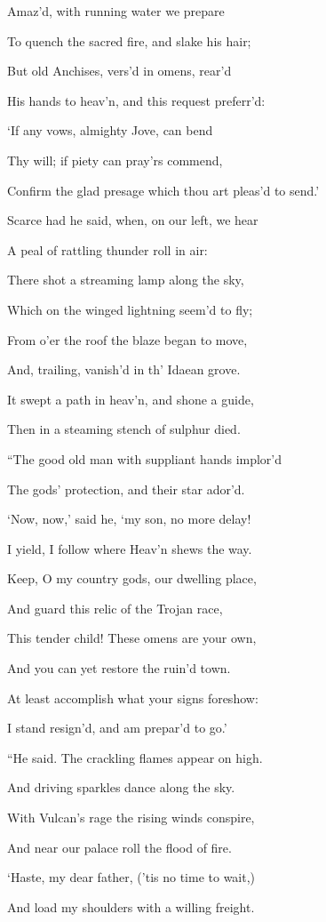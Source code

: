Amaz’d, with running water we prepare

To quench the sacred fire, and slake his hair;

But old Anchises, vers’d in omens, rear’d

His hands to heav’n, and this request preferr’d:

‘If any vows, almighty Jove, can bend

Thy will; if piety can pray’rs commend,

Confirm the glad presage which thou art pleas’d to send.’

Scarce had he said, when, on our left, we hear

A peal of rattling thunder roll in air:

There shot a streaming lamp along the sky,

Which on the winged lightning seem’d to fly;

From o’er the roof the blaze began to move,

And, trailing, vanish’d in th’ Idaean grove.

It swept a path in heav’n, and shone a guide,

Then in a steaming stench of sulphur died.

“The good old man with suppliant hands implor’d

The gods’ protection, and their star ador’d.

‘Now, now,’ said he, ‘my son, no more delay!

I yield, I follow where Heav’n shews the way.

Keep, O my country gods, our dwelling place,

And guard this relic of the Trojan race,

This tender child! These omens are your own,

And you can yet restore the ruin’d town.

At least accomplish what your signs foreshow:

I stand resign’d, and am prepar’d to go.’

“He said. The crackling flames appear on high.

And driving sparkles dance along the sky.

With Vulcan’s rage the rising winds conspire,

And near our palace roll the flood of fire.

‘Haste, my dear father, (’tis no time to wait,)

And load my shoulders with a willing freight.

